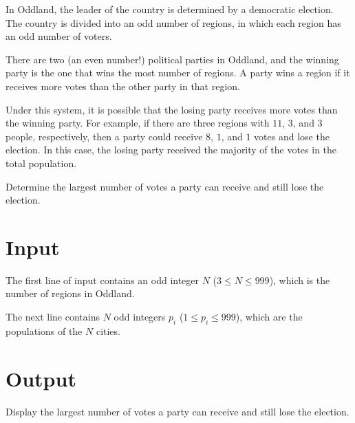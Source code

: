 
In Oddland, the leader of the country is determined by a democratic
election.  The country is divided into an odd number of regions, in
which each region has an odd number of voters.

There are two (an even number!) political parties in Oddland, and the
winning party is the one that wins the most number of regions.  A
party wins a region if it receives more votes than the other party in
that region.

Under this system, it is possible that the losing party receives more
votes than the winning party.  For example, if there are three regions
with $11$, $3$, and $3$ people, respectively, then a party could
receive $8$, $1$, and $1$ votes and lose the election.  In this case, the
losing party received the majority of the votes in the total population.

Determine the largest number of votes a party can receive and still lose
the election.


\section*{Input}

The first line of input contains an odd integer $N$ ($3 \leq N \leq
999$), which is the number of regions in Oddland. 

The next line contains $N$ odd integers $p_i$ ($1 \leq p_i \leq 999$),
which are the populations of the $N$ cities.

\section*{Output}

Display the largest number of votes a party can receive and still lose
the election.

